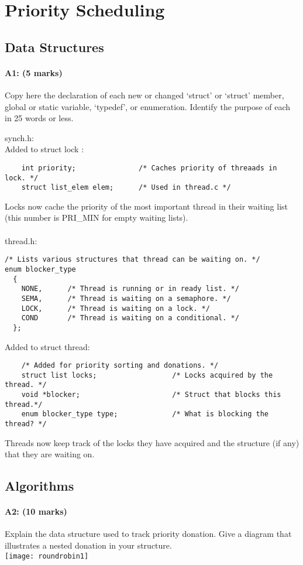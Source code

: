 \section{Priority Scheduling}
\subsection{Data Structures}
\paragraph{A1: (5 marks)}
Copy here the declaration of each new or changed `struct' or `struct' member, global or static variable, `typedef', or enumeration.  Identify the purpose of each in 25 words or less.

synch.h:\\
Added to struct lock :
\begin{verbatim}
    int priority;               /* Caches priority of threaads in lock. */
    struct list_elem elem;      /* Used in thread.c */
\end{verbatim}
Locks now cache the priority of the most important thread in their waiting list (this number is PRI\_MIN for empty waiting lists).\\ \\

thread.h:
\begin{verbatim}
/* Lists various structures that thread can be waiting on. */
enum blocker_type
  {
    NONE,      /* Thread is running or in ready list. */
    SEMA,      /* Thread is waiting on a semaphore. */
    LOCK,      /* Thread is waiting on a lock. */
    COND       /* Thread is waiting on a conditional. */
  };
\end{verbatim}

Added to struct thread:
\begin{verbatim}
    /* Added for priority sorting and donations. */
    struct list locks;                  /* Locks acquired by the thread. */
    void *blocker;                      /* Struct that blocks this thread.*/
    enum blocker_type type;             /* What is blocking the thread? */
\end{verbatim}
Threads now keep track of the locks they have acquired and the structure (if any) that they are waiting on.


\subsection{Algorithms}
\paragraph{A2: (10 marks)}
Explain the data structure used to track priority donation. Give a diagram that illustrates a nested donation in your structure.
\\
\texttt{[image: roundrobin1]}

